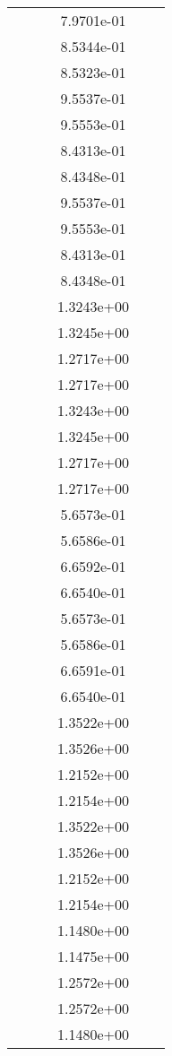 \begin{xltabular}{\textwidth}{r|rS[table-format=1.3e+2]S[table-format=1.4e+2]S[table-format=1.4e+2]S[table-format=-1.5]}
&  &  & 7.9701e-01 & & \\
&  &  & 8.5344e-01 & & \\
&  &  & 8.5323e-01 & & \\
&  &  & 9.5537e-01 & & \\
&  &  & 9.5553e-01 & & \\
&  &  & 8.4313e-01 & & \\
&  &  & 8.4348e-01 & & \\
&  &  & 9.5537e-01 & & \\
&  &  & 9.5553e-01 & & \\
&  &  & 8.4313e-01 & & \\
&  &  & 8.4348e-01 & & \\
&  &  & 1.3243e+00 & & \\
&  &  & 1.3245e+00 & & \\
&  &  & 1.2717e+00 & & \\
&  &  & 1.2717e+00 & & \\
&  &  & 1.3243e+00 & & \\
&  &  & 1.3245e+00 & & \\
&  &  & 1.2717e+00 & & \\
&  &  & 1.2717e+00 & & \\
&  &  & 5.6573e-01 & & \\
&  &  & 5.6586e-01 & & \\
&  &  & 6.6592e-01 & & \\
&  &  & 6.6540e-01 & & \\
&  &  & 5.6573e-01 & & \\
&  &  & 5.6586e-01 & & \\
&  &  & 6.6591e-01 & & \\
&  &  & 6.6540e-01 & & \\
&  &  & 1.3522e+00 & & \\
&  &  & 1.3526e+00 & & \\
&  &  & 1.2152e+00 & & \\
&  &  & 1.2154e+00 & & \\
&  &  & 1.3522e+00 & & \\
&  &  & 1.3526e+00 & & \\
&  &  & 1.2152e+00 & & \\
&  &  & 1.2154e+00 & & \\
&  &  & 1.1480e+00 & & \\
&  &  & 1.1475e+00 & & \\
&  &  & 1.2572e+00 & & \\
&  &  & 1.2572e+00 & & \\
&  &  & 1.1480e+00 & & \\

\end{xltabular}
